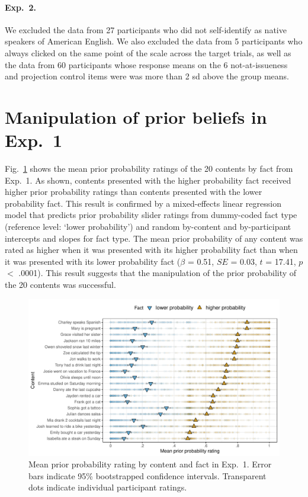 \documentclass[11pt,fleqn]{article}
\newcommand{\figref}[1]{Fig.~\ref{#1}}
\newcommand{\6}{\mbox{$[\hspace*{-.6mm}[$}}
\newcommand{\9}{\mbox{$]\hspace*{-.6mm}]$}}
\begin{document}
\paragraph{Exp.~2.} We excluded the data from 27 participants who did not self-identify as native speakers of American English. We also excluded the data from 5 participants who always clicked on the same point of the scale across the target trials, as well as the data from 60 participants whose response means on the 6 not-at-issueness and projection control items were was more than 2 sd above the group means. 

\newpage

\section{Manipulation of prior beliefs in Exp.~1}\label{a-beliefs-exp1}

\figref{f-prior} shows the mean prior probability ratings of the 20 contents by fact from Exp.~1. As shown, contents presented with the higher probability fact received higher prior probability ratings than contents presented with the lower probability fact. This result is confirmed by a mixed-effects linear regression model that predicts prior probability slider ratings from dummy-coded fact type (reference level: `lower probability') and random by-content and by-participant intercepts and slopes for fact type.  The mean prior probability of any content was rated as higher when it was presented with its higher probability fact than when it was presented with its lower probability fact ($\beta$ = 0.51, $SE$ = 0.03, $t$ = 17.41, $p$ $<$ .0001). This result suggests that the manipulation of the prior probability of the 20 contents was successful.

\begin{figure}[h!]
\centering
\includegraphics[width=.7\paperwidth]{../../results/exp1/graphs/prior-ratings}

\caption{Mean prior probability rating by content and fact in Exp.~1. Error bars indicate 95\% bootstrapped confidence intervals. Transparent dots indicate individual participant ratings.} 
\label{f-prior}
\end{figure}
\end{document}
